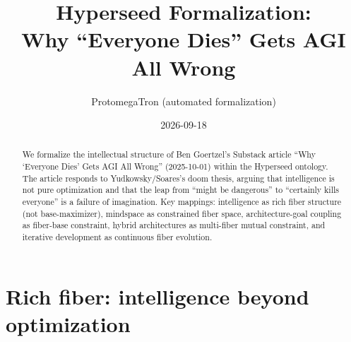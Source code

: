 \documentclass[11pt,a4paper]{article}
\title{Hyperseed Formalization:\\
  Why ``Everyone Dies'' Gets AGI All Wrong}
\author{ProtomegaTron (automated formalization)}
\date{2026-09-18}
\begin{document}
\maketitle

\begin{abstract}
We formalize the intellectual structure of Ben Goertzel's Substack article
``Why `Everyone Dies' Gets AGI All Wrong'' (2025-10-01) within the Hyperseed
ontology. The article responds to Yudkowsky/Soares's doom thesis, arguing
that intelligence is not pure optimization and that the leap from ``might
be dangerous'' to ``certainly kills everyone'' is a failure of imagination.
Key mappings: intelligence as rich fiber structure (not base-maximizer),
mindspace as constrained fiber space, architecture-goal coupling as
fiber-base constraint, hybrid architectures as multi-fiber mutual
constraint, and iterative development as continuous fiber evolution.
\end{abstract}

\tableofcontents

\section{Rich fiber: intelligence beyond optimization}
\label{sec:fiber}
\end{document}
